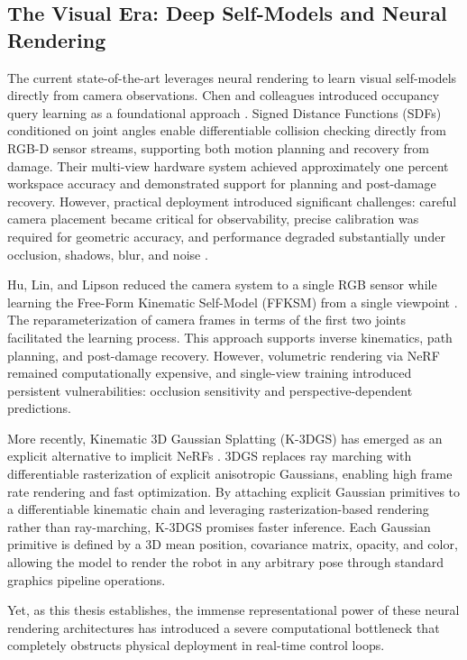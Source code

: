\documentclass[12pt,a4paper,oneside]{report}
\begin{document}
\subsection{The Visual Era: Deep Self-Models and Neural Rendering}

The current state-of-the-art leverages neural rendering to learn visual self-models directly from camera observations. Chen and colleagues introduced occupancy query learning as a foundational approach \cite{chen2022full}. Signed Distance Functions (SDFs) conditioned on joint angles enable differentiable collision checking directly from RGB-D sensor streams, supporting both motion planning and recovery from damage. Their multi-view hardware system achieved approximately one percent workspace accuracy and demonstrated support for planning and post-damage recovery. However, practical deployment introduced significant challenges: careful camera placement became critical for observability, precise calibration was required for geometric accuracy, and performance degraded substantially under occlusion, shadows, blur, and noise \cite{chen2022full}.

Hu, Lin, and Lipson reduced the camera system to a single RGB sensor while learning the Free-Form Kinematic Self-Model (FFKSM) from a single viewpoint \cite{hu2024teaching}. The reparameterization of camera frames in terms of the first two joints facilitated the learning process. This approach supports inverse kinematics, path planning, and post-damage recovery. However, volumetric rendering via NeRF remained computationally expensive, and single-view training introduced persistent vulnerabilities: occlusion sensitivity and perspective-dependent predictions.

More recently, Kinematic 3D Gaussian Splatting (K-3DGS) has emerged as an explicit alternative to implicit NeRFs \cite{hu2025learning}. 3DGS replaces ray marching with differentiable rasterization of explicit anisotropic Gaussians, enabling high frame rate rendering and fast optimization. By attaching explicit Gaussian primitives to a differentiable kinematic chain and leveraging rasterization-based rendering rather than ray-marching, K-3DGS promises faster inference. Each Gaussian primitive is defined by a 3D mean position, covariance matrix, opacity, and color, allowing the model to render the robot in any arbitrary pose through standard graphics pipeline operations.

Yet, as this thesis establishes, the immense representational power of these neural rendering architectures has introduced a severe computational bottleneck that completely obstructs physical deployment in real-time control loops.
\end{document}
